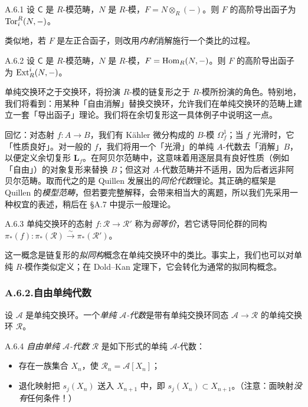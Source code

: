 \begin{exam}{A.6.1}\label{thm:a6-07-5}
设 $\mathsf C$ 是 $R$-模范畴，$N$ 是 $R$-模，$F=N\otimes_R(-)$。则 $F$ 的高阶导出函子为 $\operatorname{Tor}_i^R(N,-)$。
\end{exam}

类似地，若 $F$ 是左正合函子，则改用\emph{内射}消解施行一个类比的过程。

\begin{exam}{A.6.2}\label{thm:a6-07-6}
设 $\mathsf C$ 是 $R$-模范畴，$N$ 是 $R$-模，$F=\operatorname{Hom}_R(N,-)$。则 $F$ 的高阶导出函子为 $\operatorname{Ext}^i_R(N,-)$。
\end{exam}

单纯交换环之于交换环，将扮演 $R$-模的链复形之于 $R$-模所扮演的角色。特别地，我们将看到：用某种「自由消解」替换交换环，允许我们在单纯交换环的范畴上建立一套「导出函子」理论。我们将在余切复形这一具体例子中说明这一点。

回忆：对态射 $f\colon A\to B$，我们有 Kähler 微分构成的 $B$-模 $\Omega^1_f$；当 $f$ 光滑时，它「性质良好」。对一般的 $f$，我们将用一个「光滑」的单纯 $A$-代数去「消解」$B$，以便定义余切复形 $\mathbf L_f$。在阿贝尔范畴中，这意味着用逐层具有良好性质（例如「自由」）的对象复形来替换 $B$；但这对 $A$-代数范畴并不适用，因为后者远非阿贝尔范畴。取而代之的是 Quillen 发展出的\emph{同伦代数}理论。其正确的框架是 Quillen 的\emph{模型范畴}，但若要完整解释，会带来相当大的离题，所以我们先采用一种权宜的表述，稍后在 §A.7 中提示一般理论。

\begin{defn}{A.6.3}\label{thm:a6-07-7}
单纯交换环的态射 $f\colon\mathcal R\to\mathcal R'$ 称为\emph{弱等价}，若它诱导同伦群的同构 $\pi_*(f)\colon\pi_*(\mathcal R)\xrightarrow{\sim}\pi_*(\mathcal R')$。
\end{defn}

这一概念是链复形的\emph{拟同构}概念在单纯交换环中的类比。事实上，我们也可以对单纯 $R$-模作类似定义；在 Dold--Kan 定理下，它会转化为通常的拟同构概念。

\subsubsection*{A.6.2.\quad 自由单纯代数}

设 $\mathcal A$ 是单纯交换环。一个\emph{单纯 $\mathcal A$-代数}是带有单纯交换环同态 $\mathcal A\to\mathcal R$ 的单纯交换环 $\mathcal R$。

\begin{defn}{A.6.4}\label{thm:a6-07-8}
\emph{自由单纯 $\mathcal A$-代数} $\mathcal R$ 是如下形式的单纯 $\mathcal A$-代数：
\begin{itemize}
\item 存在一族集合 $X_n$，使 $\mathcal R_n=\mathcal A[X_n]$；
\item 退化映射把 $s_j(X_n)$ 送入 $X_{n+1}$ 中，即 $s_j(X_n)\subset X_{n+1}$。（注意：面映射\emph{没有}任何条件！）
\end{itemize}
\end{defn}

